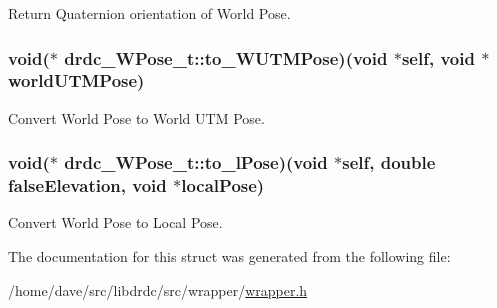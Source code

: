 Return Quaternion orientation of World Pose. 

\hypertarget{structdrdc__WPose__t_863289a024c1e98d515f5d2f30cb7e54}{
\subsubsection[to\_\-WUTMPose]{\setlength{\rightskip}{0pt plus 5cm}void($\ast$ {\bf drdc\_\-WPose\_\-t::to\_\-WUTMPose})(void $\ast$self, void $\ast$worldUTMPose)}}
\label{structdrdc__WPose__t_863289a024c1e98d515f5d2f30cb7e54}


Convert World Pose to World UTM Pose. 

\hypertarget{structdrdc__WPose__t_a4c73a193364ec71974ea44e10bde8a6}{
\subsubsection[to\_\-lPose]{\setlength{\rightskip}{0pt plus 5cm}void($\ast$ {\bf drdc\_\-WPose\_\-t::to\_\-lPose})(void $\ast$self, double falseElevation, void $\ast$localPose)}}
\label{structdrdc__WPose__t_a4c73a193364ec71974ea44e10bde8a6}


Convert World Pose to Local Pose. 



The documentation for this struct was generated from the following file:\begin{CompactItemize}
\item 
/home/dave/src/libdrdc/src/wrapper/\hyperlink{wrapper_8h}{wrapper.h}\end{CompactItemize}
